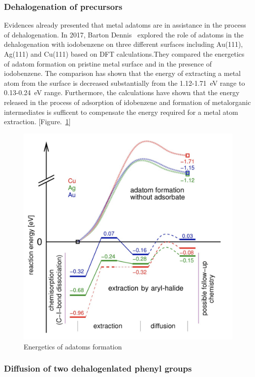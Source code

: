 \documentclass[aps,reprint,amsmath,amssymb]{revtex4-2}
\begin{document}
\subsubsection{Dehalogenation of precursors}

Evidences already presented that metal adatoms are in assistance in the process of dehalogenation. In 2017, Barton Dennis~\cite{chemeurope2017} explored the role of adatoms in the dehalogenation with iodobenzene on three different surfaces including Au(111), Ag(111) and Cu(111) based on DFT calculations.They compared the energetics of adatom formation on pristine metal surface and in the presence of iodobenzene. The comparison has shown that the energy of extracting a metal atom from the surface is decreased substantially from the 1.12-1.71~eV range to 0.13-0.24~eV range. Furthermore, the calculations have shown that the energy released in the process of adsorption of idobenzene and formation of metalorganic intermediates is sufficent to compensate the energy required for a metal atom extraction. [Figure.~\ref{fig:3}]

\begin{figure}[ht]
\centering
\includegraphics[width=0.98\columnwidth]{Fig/Adatom-formation.png}
\caption{Energetics of adatoms formation}
\label{fig:3}
\end{figure}


\subsubsection{Diffusion of two dehalogenlated phenyl groups}
\end{document}
